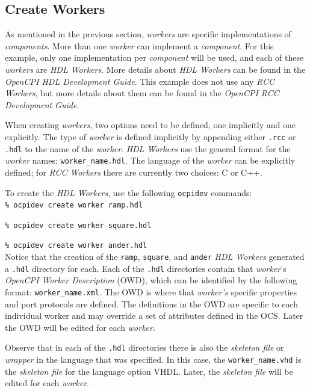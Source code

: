 \subsection{Create Workers}
As mentioned in the previous section, \textit{workers} are specific implementations of \textit{components}. More than one \textit{worker} can implement a \textit{component}. For this example, only one implementation per \textit{component} will be used, and each of these \textit{workers} are \textit{HDL Workers}. More details about \textit{HDL Workers} can be found in the \textit{OpenCPI HDL Development Guide}. This example does not use any \textit{RCC Workers}, but more details about them can be found in the \textit{OpenCPI RCC Development Guide}.\newline

When creating \textit{workers}, two options need to be defined, one implicitly and one explicitly. The type of \textit{worker} is defined implicitly by appending either \verb+.rcc+ or \verb+.hdl+ to the name of the \textit{worker}. \textit{HDL Workers} use the general format for the \textit{worker} names: \verb+worker_name.hdl+. The language of the \textit{worker} can be explicitly defined; for \textit{RCC Workers} there are currently two choices: C or C++.\newline

To create the \textit{HDL Workers}, use the following \verb+ocpidev+ commands:\\

\forceindent\verb+% ocpidev create worker ramp.hdl+

\forceindent\verb+% ocpidev create worker square.hdl+

\forceindent\verb+% ocpidev create worker ander.hdl+\\

Notice that the creation of the \verb+ramp+, \verb+square+, and \verb+ander+ \textit{HDL Workers} generated a \verb+.hdl+ directory for each. Each of the \verb+.hdl+ directories contain that \textit{worker}'s \textit{OpenCPI Worker Description} (OWD), which can be identified by the following format: \verb+worker_name.xml+. The OWD is where that \textit{worker's} specific properties and port protocols are defined. The definitions in the OWD are specific to each individual worker and may override a set of attributes defined in the OCS. Later the OWD will be edited for each \textit{worker}.\newline

Observe that in each of the \verb+.hdl+ directories there is also the \textit{skeleton file} or \textit{wrapper} in the language that was specified. In this case, the \verb+worker_name.vhd+ is the \textit{skeleton file} for the language option VHDL. Later, the \textit{skeleton file} will be edited for each \textit{worker}.\newline


